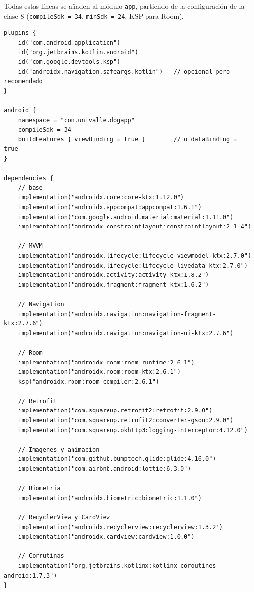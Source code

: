 \documentclass[11pt,letterpaper]{article}
\newcommand{\code}[1]{\texttt{\small #1}}
\begin{document}
Todas estas l\'ineas se a\~naden al m\'odulo \code{app}, partiendo de la
configuraci\'on de la clase 8 (\code{compileSdk =\allowbreak{} 34}, \code{minSdk =\allowbreak{} 24}, KSP para
Room).

\begin{verbatim}
plugins {
    id("com.android.application")
    id("org.jetbrains.kotlin.android")
    id("com.google.devtools.ksp")
    id("androidx.navigation.safeargs.kotlin")   // opcional pero recomendado
}

android {
    namespace = "com.univalle.dogapp"
    compileSdk = 34
    buildFeatures { viewBinding = true }        // o dataBinding = true
}

dependencies {
    // base
    implementation("androidx.core:core-ktx:1.12.0")
    implementation("androidx.appcompat:appcompat:1.6.1")
    implementation("com.google.android.material:material:1.11.0")
    implementation("androidx.constraintlayout:constraintlayout:2.1.4")

    // MVVM
    implementation("androidx.lifecycle:lifecycle-viewmodel-ktx:2.7.0")
    implementation("androidx.lifecycle:lifecycle-livedata-ktx:2.7.0")
    implementation("androidx.activity:activity-ktx:1.8.2")
    implementation("androidx.fragment:fragment-ktx:1.6.2")

    // Navigation
    implementation("androidx.navigation:navigation-fragment-ktx:2.7.6")
    implementation("androidx.navigation:navigation-ui-ktx:2.7.6")

    // Room
    implementation("androidx.room:room-runtime:2.6.1")
    implementation("androidx.room:room-ktx:2.6.1")
    ksp("androidx.room:room-compiler:2.6.1")

    // Retrofit
    implementation("com.squareup.retrofit2:retrofit:2.9.0")
    implementation("com.squareup.retrofit2:converter-gson:2.9.0")
    implementation("com.squareup.okhttp3:logging-interceptor:4.12.0")

    // Imagenes y animacion
    implementation("com.github.bumptech.glide:glide:4.16.0")
    implementation("com.airbnb.android:lottie:6.3.0")

    // Biometria
    implementation("androidx.biometric:biometric:1.1.0")

    // RecyclerView y CardView
    implementation("androidx.recyclerview:recyclerview:1.3.2")
    implementation("androidx.cardview:cardview:1.0.0")

    // Corrutinas
    implementation("org.jetbrains.kotlinx:kotlinx-coroutines-android:1.7.3")
}
\end{verbatim}
\end{document}
